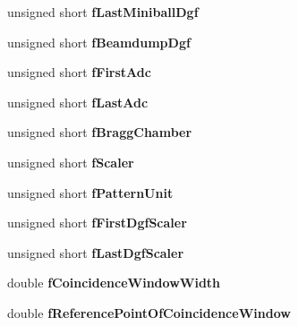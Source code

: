\begin{DoxyCompactItemize}
\mbox{\label{class_global_settings_ae650a409541da5bf8cc67778d4e34845}} 
unsigned short {\bfseries f\+Last\+Miniball\+Dgf}
\item 
\mbox{\label{class_global_settings_a76296bafe3844f4ee63b34b0b5c2600e}} 
unsigned short {\bfseries f\+Beamdump\+Dgf}
\item 
\mbox{\label{class_global_settings_aa70de9fe6e03b15d344f75d91f45b25b}} 
unsigned short {\bfseries f\+First\+Adc}
\item 
\mbox{\label{class_global_settings_a74d18d73a1b28ffe37f17877b5d2bf4f}} 
unsigned short {\bfseries f\+Last\+Adc}
\item 
\mbox{\label{class_global_settings_a95d6d5584cddb3d89a457db7359a9a9d}} 
unsigned short {\bfseries f\+Bragg\+Chamber}
\item 
\mbox{\label{class_global_settings_ad4d098d925cc88a0a9e538648c3d2017}} 
unsigned short {\bfseries f\+Scaler}
\item 
\mbox{\label{class_global_settings_a1d66578500af2f9b423a0d34ebf9bea6}} 
unsigned short {\bfseries f\+Pattern\+Unit}
\item 
\mbox{\label{class_global_settings_a0a209cc9dbb3763e646b9c61a43a6637}} 
unsigned short {\bfseries f\+First\+Dgf\+Scaler}
\item 
\mbox{\label{class_global_settings_aa397f932c6dc717b89f6e6b2dc740006}} 
unsigned short {\bfseries f\+Last\+Dgf\+Scaler}
\item 
\mbox{\label{class_global_settings_aa4ea12bfdc34312dcb279bdf2efbcbb3}} 
double {\bfseries f\+Coincidence\+Window\+Width}
\item 
\mbox{\label{class_global_settings_a83d940cc19cbd1a4df880d0f4bb9f7ab}} 
double {\bfseries f\+Reference\+Point\+Of\+Coincidence\+Window}
\item 
\mbox{\label{class_global_settings_ad933baf31ffb6ce12452fb48e78aae9c}} 

\end{DoxyCompactItemize}
